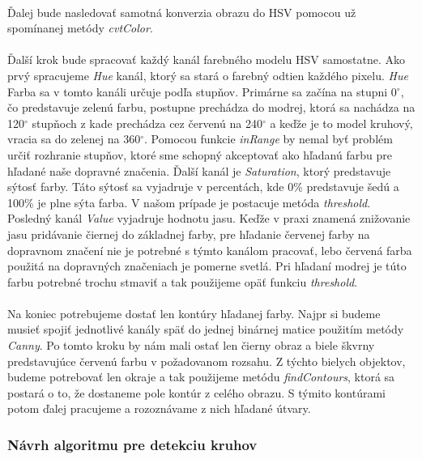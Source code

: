 \documentclass[12pt]{article}
\begin{document}
\paragraph{}
Ďalej bude nasledovať samotná konverzia obrazu do HSV pomocou už spomínanej metódy \emph{cvtColor}.
\paragraph{}
Ďalší krok bude spracovať každý kanál farebného modelu HSV samostatne. Ako prvý spracujeme \emph{Hue} kanál, ktorý sa stará o farebný odtien každého pixelu.
\emph{Hue} Farba sa v tomto kanáli určuje podľa stupňov. 
Primárne sa začína na stupni 0$^\circ$, čo predstavuje zelenú farbu, postupne prechádza do modrej,
ktorá sa nachádza na 120$^\circ$ stupňoch z kade prechádza cez červenú na 240$^\circ$ a keďže je to model kruhový, vracia sa do zelenej na 360$^\circ$.
Pomocou funkcie \emph{inRange} by nemal byť problém určiť rozhranie stupňov, ktoré sme schopný akceptovať ako hľadanú farbu pre hľadané naše dopravné značenia.
Ďalší kanál je \emph{Saturation}, ktorý predstavuje sýtosť farby. Táto sýtosť sa vyjadruje v percentách, kde 0\% predstavuje šedú a 100\% je plne sýta farba.\cite{hsv_wiki_cz} 
V našom prípade je postacuje metóda \emph{threshold}. Posledný kanál \emph{Value} vyjadruje hodnotu jasu.
Keďže v praxi znamená znižovanie jasu pridávanie čiernej do základnej farby,
pre hľadanie červenej farby na dopravnom značení nie je potrebné s týmto kanálom pracovať, lebo červená farba použitá na dopravných značeniach je pomerne svetlá.
Pri hľadaní modrej je túto farbu potrebné trochu stmaviť a tak použijeme opäť funkciu \emph{threshold}.
\paragraph{}
Na koniec potrebujeme dostať len kontúry hľadanej farby. 
Najpr si budeme musieť spojiť jednotlivé kanály späť do jednej binárnej matice použitím metódy \emph{Canny}. 
Po tomto kroku by nám mali ostať len čierny obraz a biele škvrny predstavujúce červenú farbu v požadovanom rozsahu.
Z týchto bielych objektov, budeme potrebovať len okraje a tak použijeme metódu \emph{findContours}, ktorá sa postará o to, že dostaneme pole kontúr z celého obrazu.
S týmito kontúrami potom ďalej pracujeme a rozoznávame z nich hľadané útvary.
\subsubsection{Návrh algoritmu pre detekciu kruhov}
\end{document}
